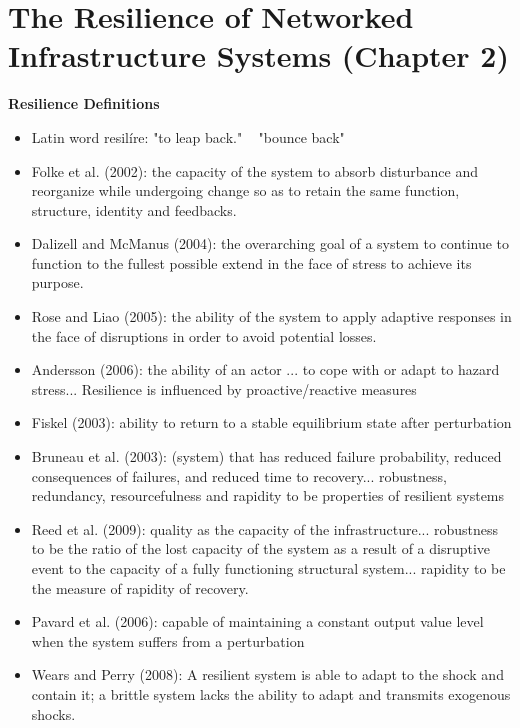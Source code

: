 \section{The Resilience of Networked Infrastructure Systems (Chapter 2)}
\textbf{Resilience Definitions}
\begin{itemize}
  \item Latin word resilíre: "to leap back." ~ "bounce back"
  \item Folke et al. (2002): the capacity of the system to absorb disturbance and reorganize while undergoing change so as to retain the same function, structure, identity and feedbacks.
  \item Dalizell and McManus (2004): the overarching goal of a system to continue to function to the fullest possible extend in the face of stress to achieve its purpose.
  \item Rose and Liao (2005): the ability of the system to apply adaptive responses in the face of disruptions in order to avoid potential losses.
  \item Andersson (2006): the ability of an actor ... to cope with or adapt to hazard stress... Resilience is influenced by proactive/reactive measures
  \item Fiskel (2003): ability to return to a stable equilibrium state after perturbation
  \item Bruneau et al. (2003): (system) that has reduced failure probability, reduced consequences of failures, and reduced time to recovery... robustness, redundancy, resourcefulness and rapidity to be properties of resilient systems
  \item Reed et al. (2009): quality as the capacity of the infrastructure... robustness to be the ratio of the lost capacity of the system as a result of a disruptive event to the capacity of a fully functioning structural system... rapidity to be the measure of rapidity of recovery.
  \item Pavard et al. (2006): capable of maintaining a constant output value level when the system suffers from a perturbation
  \item Wears and Perry (2008): A resilient system is able to adapt to the shock and contain it; a brittle system lacks the ability to adapt and transmits exogenous shocks.
\end{itemize}

